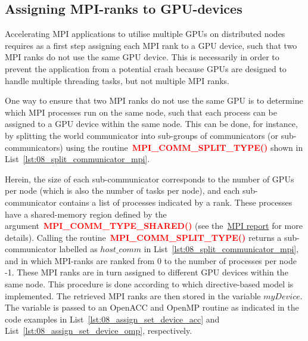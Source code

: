 \subsection{Assigning MPI-ranks to GPU-devices}


\par
Accelerating MPI applications to utilise multiple GPUs on distributed nodes requires as a first step assigning each MPI rank to a GPU device, such that two MPI ranks do not use the same GPU device.
This is necessarily in order to prevent the application from a potential crash because GPUs are designed to handle multiple threading tasks, but not multiple MPI ranks.


\par
One way to ensure that two MPI ranks do not use the same GPU is to determine which MPI processes run on the same node, such that each process can be assigned to a GPU device within the same node.
This can be done, for instance, by splitting the world communicator into sub-groups of communicators (or sub-communicators) using the routine~\textbf{\textcolor{red}{MPI\_COMM\_SPLIT\_TYPE()}} shown in List~\ref{lst:08_split_communicator_mpi}. 





\par
Herein, the size of each sub-communicator corresponds to the number of GPUs per node (which is also the number of tasks per node), and each sub-communicator contains a list of processes indicated by a rank.
These processes have a shared-memory region defined by the argument~\textbf{\textcolor{red}{MPI\_COMM\_TYPE\_SHARED()}} (see the~\href{https://www.mpi-forum.org/docs/mpi-4.0/mpi40-report.pdf}{MPI report} for more details).
Calling the routine~\textbf{\textcolor{red}{MPI\_COMM\_SPLIT\_TYPE()}} returns a sub-communicator labelled as $host\_comm$ in List~\ref{lst:08_split_communicator_mpi}, and in which MPI-ranks are ranked from 0 to the number of processes per node -1.
These MPI ranks are in turn assigned to different GPU devices within the same node.
This procedure is done according to which directive-based model is implemented.
The retrieved MPI ranks are then stored in the variable $myDevice$.
The variable is passed to an OpenACC and OpenMP routine as indicated in the code examples in List~\ref{lst:08_assign_set_device_acc} and List~\ref{lst:08_assign_set_device_omp}, respectively.



